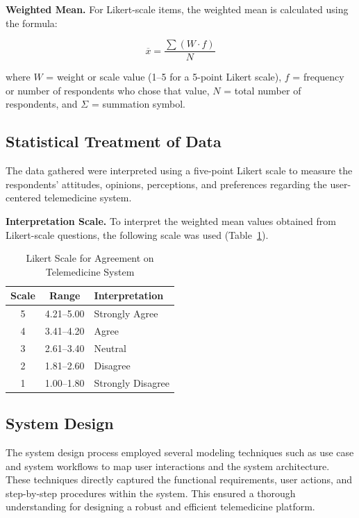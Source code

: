 \documentclass{research}
\begin{document}
\textbf{Weighted Mean.} For Likert-scale items, the weighted mean is calculated using the formula:

\begin{equation}
  \overline{x} = \frac{\sum (W \cdot f)}{N}
  \label{eq:wm}
\end{equation}

\noindent where $W$ = weight or scale value (1--5 for a 5-point Likert scale), $f$ = frequency or
number of respondents who chose that value, $N$ = total number of respondents, and $\Sigma$ =
summation symbol.

\subsection*{Statistical Treatment of Data}

The data gathered were interpreted using a five-point Likert scale to measure the respondents'
attitudes, opinions, perceptions, and preferences regarding the user-centered telemedicine system.

\textbf{Interpretation Scale.} To interpret the weighted mean values obtained from Likert-scale
questions, the following scale was used (Table~\ref{tab:likert}).

\begin{table}[H]
  \centering
  \caption{Likert Scale for Agreement on Telemedicine System}
  \label{tab:likert}
  \begin{tabular}{ccl}
    \toprule
    \textbf{Scale} & \textbf{Range} & \textbf{Interpretation} \\
    \midrule
    5 & 4.21--5.00 & Strongly Agree   \\
    4 & 3.41--4.20 & Agree            \\
    3 & 2.61--3.40 & Neutral          \\
    2 & 1.81--2.60 & Disagree         \\
    1 & 1.00--1.80 & Strongly Disagree \\
    \bottomrule
  \end{tabular}
\end{table}

\subsection*{System Design}

The system design process employed several modeling techniques such as use case and system
workflows to map user interactions and the system architecture. These techniques directly captured
the functional requirements, user actions, and step-by-step procedures within the system. This
ensured a thorough understanding for designing a robust and efficient telemedicine platform.
\end{document}
